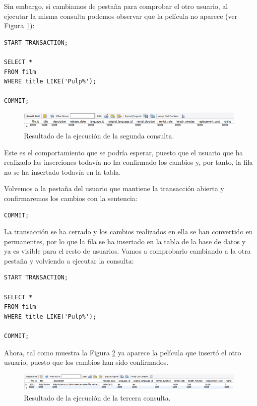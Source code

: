 \documentclass[a4paper]{article}
\begin{document}
Sin embargo, si cambiamos de pestaña para comprobar el otro usuario, al ejecutar la misma consulta podemos observar que la película no aparece (ver Figura \ref{fig:2consulta}):

\begin{verbatim}
START TRANSACTION;

SELECT * 
FROM film
WHERE title LIKE('Pulp%');

COMMIT;
\end{verbatim}

\begin{figure}[ht]
    \centering
    \includegraphics[width=0.9\columnwidth]{figs/2consulta.png}
    \caption{Resultado de la ejecución de la segunda consulta.}\label{fig:2consulta}
\end{figure}

Este es el comportamiento que se podría esperar, puesto que el usuario que ha realizado las inserciones todavía no ha confirmado los cambios y, por tanto, la fila no se ha insertado todavía en la tabla.

Volvemos a la pestaña del usuario que mantiene la transacción abierta y confirmaremos los cambios con la sentencia:

\begin{verbatim}
COMMIT;
\end{verbatim}

La transacción se ha cerrado y los cambios realizados en ella se han convertido en permanentes, por lo que la fila se ha insertado en la tabla de la base de datos y ya es visible para el resto de usuarios. Vamos a comprobarlo cambiando a la otra pestaña y volviendo a ejecutar la consulta:

\begin{verbatim}
START TRANSACTION;

SELECT * 
FROM film
WHERE title LIKE('Pulp%');

COMMIT;
\end{verbatim}

Ahora, tal como muestra la Figura \ref{fig:3consulta} ya aparece la película que insertó el otro usuario, puesto que los cambios han sido confirmados.

\begin{figure}[ht]
    \centering
    \includegraphics[width=0.9\columnwidth]{figs/3consulta.png}
    \caption{Resultado de la ejecución de la tercera consulta.}\label{fig:3consulta}
\end{figure}
\end{document}
